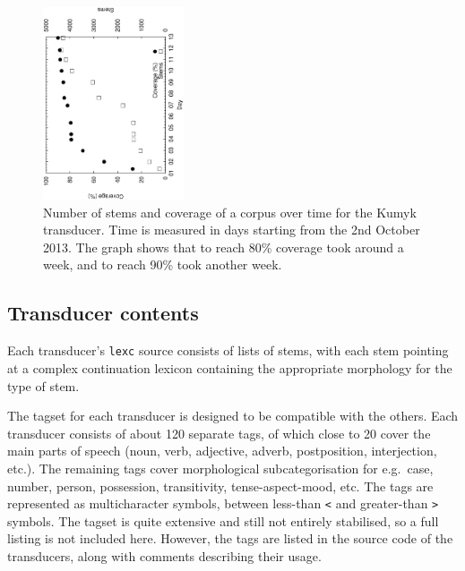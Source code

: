 \documentclass[a4paper,11pt,twocolumn]{article}
\begin{document}
\begin{figure}
\hspace{-30pt}
\includegraphics[width=0.37\textwidth,bb=50 50 554 770,angle=270]{graphs/kumyk-yoldash-coverage}

\vspace{1.2em}
\caption{Number of stems and coverage of a corpus over time for the Kumyk transducer. Time is measured in days 
starting from the 2nd October 2013. The graph shows that to reach 80\% coverage took
around a week, and to reach 90\% took another week.}
\label{fig:kumcov}
\vspace{-1.8em}
\end{figure}

\subsection{Transducer contents}

Each transducer's \texttt{lexc} source consists of lists of stems, with each stem pointing at a complex continuation lexicon containing the appropriate morphology for the type of stem.  

The tagset for each transducer is designed to be compatible with the others.  Each transducer consists of about 120 separate tags, of which close to 20 cover the main parts of speech (noun, verb, adjective, adverb, postposition, interjection, etc.).  The remaining tags cover morphological subcategorisation for e.g.\ case, number, person, possession, transitivity, tense-aspect-mood, etc.  The tags are represented as multicharacter symbols, between less-than \texttt{<} and greater-than \texttt{>} symbols.  The tagset is quite extensive and still not entirely stabilised, so a full listing is not included here.  However, the tags are listed in the source code of the transducers, along with comments describing their usage.
\end{document}

